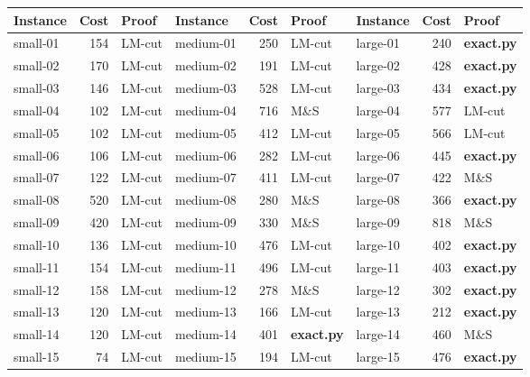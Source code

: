 \begin{tabular}{lrl@{\hspace{1.2em}}lrl@{\hspace{1.2em}}lrl}
\toprule
Instance & Cost & Proof & Instance & Cost & Proof & Instance & Cost & Proof \\
\midrule
small-01 & 154 & LM-cut & medium-01 & 250 & LM-cut & large-01 & 240 & \textbf{exact.py} \\
small-02 & 170 & LM-cut & medium-02 & 191 & LM-cut & large-02 & 428 & \textbf{exact.py} \\
small-03 & 146 & LM-cut & medium-03 & 528 & LM-cut & large-03 & 434 & \textbf{exact.py} \\
small-04 & 102 & LM-cut & medium-04 & 716 & M\&S & large-04 & 577 & LM-cut \\
small-05 & 102 & LM-cut & medium-05 & 412 & LM-cut & large-05 & 566 & LM-cut \\
small-06 & 106 & LM-cut & medium-06 & 282 & LM-cut & large-06 & 445 & \textbf{exact.py} \\
small-07 & 122 & LM-cut & medium-07 & 411 & LM-cut & large-07 & 422 & M\&S \\
small-08 & 520 & LM-cut & medium-08 & 280 & M\&S & large-08 & 366 & \textbf{exact.py} \\
small-09 & 420 & LM-cut & medium-09 & 330 & M\&S & large-09 & 818 & M\&S \\
small-10 & 136 & LM-cut & medium-10 & 476 & LM-cut & large-10 & 402 & \textbf{exact.py} \\
small-11 & 154 & LM-cut & medium-11 & 496 & LM-cut & large-11 & 403 & \textbf{exact.py} \\
small-12 & 158 & LM-cut & medium-12 & 278 & M\&S & large-12 & 302 & \textbf{exact.py} \\
small-13 & 120 & LM-cut & medium-13 & 166 & LM-cut & large-13 & 212 & \textbf{exact.py} \\
small-14 & 120 & LM-cut & medium-14 & 401 & \textbf{exact.py} & large-14 & 460 & M\&S \\
small-15 & 74 & LM-cut & medium-15 & 194 & LM-cut & large-15 & 476 & \textbf{exact.py} \\
\bottomrule
\end{tabular}

